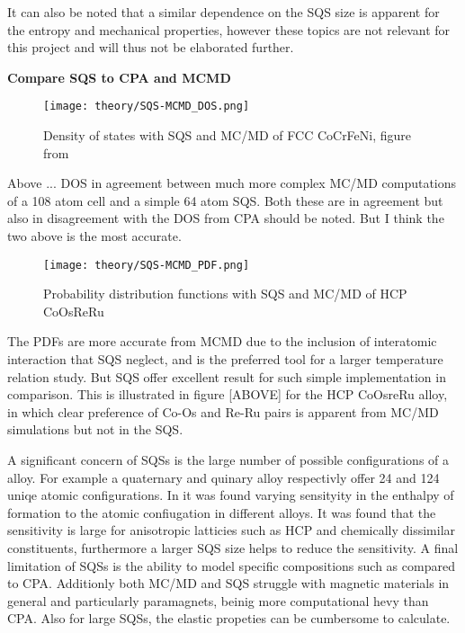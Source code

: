 It can also be noted that a similar dependence on the SQS size is apparent for the entropy and mechanical properties, however these topics are not relevant for this project and will thus not be elaborated further. 
    
\textbf{Compare SQS to CPA and MCMD}
    
\begin{figure}[H]
\centering
\texttt{[image: theory/SQS-MCMD\_DOS.png]}
\caption{Density of states with SQS and MC/MD of FCC CoCrFeNi, figure from \cite{hea2016_ch10}}
\end{figure}

Above ... DOS in agreement between much more complex MC/MD computations of a 108 atom cell and a simple 64 atom SQS. Both these are in agreement but also in disagreement with the DOS from CPA should be noted. But I think the two above is the most accurate. 


\begin{figure}[H]
\centering
\texttt{[image: theory/SQS-MCMD\_PDF.png]}
\caption{Probability distribution functions with SQS and MC/MD of HCP CoOsReRu \cite{hea2016_ch10}}
\end{figure}

The PDFs are more accurate from MCMD due to the inclusion of interatomic interaction that SQS neglect, and is the preferred tool for a larger temperature relation study. But SQS offer excellent result for such simple implementation in comparison. This is illustrated in figure [ABOVE] for the HCP CoOsreRu alloy, in which clear preference of Co-Os and Re-Ru pairs is apparent from MC/MD simulations but not in the SQS. 

A significant concern of SQSs is the large number of possible configurations of a alloy. For example a quaternary and quinary alloy respectivly offer 24 and 124 uniqe atomic configurations. In \cite{hea2016_ch10} it was found varying sensityity in the enthalpy of formation to the atomic confiugation in different alloys. It was found that the sensitivity is large for anisotropic latticies such as HCP and chemically dissimilar constituents, furthermore a larger SQS size helps to reduce the sensitivity. A final limitation of SQSs is the ability to model specific compositions such as  compared to CPA. Additionly both MC/MD and SQS struggle with magnetic materials in general and particularly paramagnets, beinig more computational hevy than CPA. Also for large SQSs, the elastic propeties can be cumbersome to calculate. 


